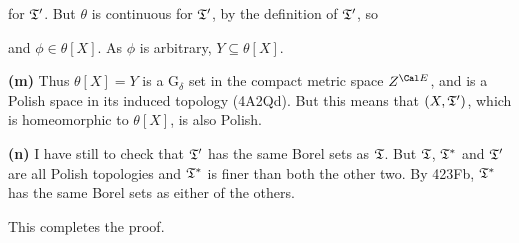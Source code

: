 {

\noindent for $\frak T'$.   But $\theta$ is continuous for $\frak T'$,
by the definition of $\frak T'$, so


\noindent and $\phi\in\theta[X]$.   As $\phi$ is arbitrary,
$Y\subseteq\theta[X]$.\ \Qed

\medskip

{\bf (m)} Thus $\theta[X]=Y$ is a G$_{\delta}$ set in the compact metric
space $Z^{\Cal E}$, and is a Polish space in its induced topology
(4A2Qd).   But this means that $(X,\frak T')$, which is homeomorphic to
$\theta[X]$, is also Polish.

\medskip

{\bf (n)} I have still to check that $\frak T'$ has the same Borel sets
as $\frak T$.   But $\frak T$, $\frak T^*$ and $\frak T'$ are all Polish
topologies and $\frak T^*$ is finer than both the other two.   By 423Fb,
$\frak T^*$ has the same Borel sets as either of the others.

This completes the proof.
}%

